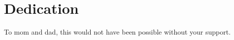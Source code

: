 \documentclass[./dissertation.tex]{subfiles}
\begin{document}
  \chapter*{Dedication}

  \centering
  To mom and dad, this would not have been possible without your support.
\end{document}

